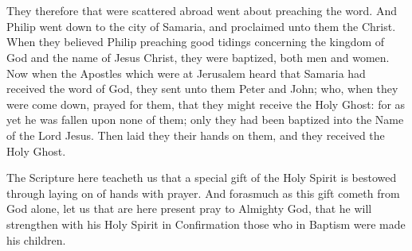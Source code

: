 
\chapter[Confirmation]{}






They therefore that were scattered abroad went about preaching the word. And Philip went down to the city of Samaria, and proclaimed unto them the Christ. When they believed Philip preaching good tidings concerning the kingdom of God and the name of Jesus Christ, they were baptized, both men and women. Now when the Apostles which were at Jerusalem heard that Samaria had received the word of God, they sent unto them Peter and John; who, when they were come down, prayed for them, that they might receive the Holy Ghost: for as yet he was fallen upon none of them; only they had been baptized into the Name of the Lord Jesus. Then laid they their hands on them, and they received the Holy Ghost.

The Scripture here teacheth us that a special gift of the Holy Spirit is bestowed through laying on of hands with prayer. And forasmuch as this gift cometh from God alone, let us that are here present pray to Almighty God, that he will strengthen with his Holy Spirit in Confirmation those who in Baptism were made his children.


